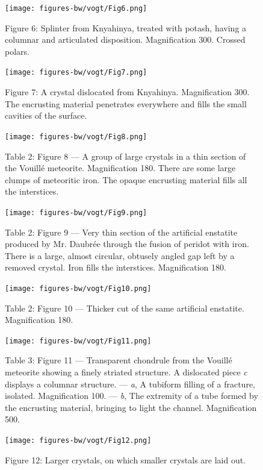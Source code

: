 \documentclass[a4paper, 12pt, oneside]{article}
\begin{document}
\clearpage
\begin{figure}[b]
\centering
\texttt{[image: figures-bw/vogt/Fig6.png]}
\caption{Figure 6: Splinter from Knyahinya, treated with potash, having a columnar and articulated disposition. Magnification 300. Crossed polars.}
\end{figure}
\clearpage
\begin{figure}[b]
\centering
\texttt{[image: figures-bw/vogt/Fig7.png]}
\caption{Figure 7: A crystal dislocated from Knyahinya. Magnification 300. The encrusting material penetrates everywhere and fills the small cavities of the surface.}
\end{figure}
\clearpage
\begin{figure}[b]
\texttt{[image: figures-bw/vogt/Fig8.png]}
\caption{Table 2: Figure 8 --- A group of large crystals in a thin section of the Vouillé meteorite. Magnification 180. There are some large clumps of meteoritic iron. The opaque encrusting material fills all the interstices.}
\centering
\end{figure}
\clearpage
\begin{figure}[b]
\texttt{[image: figures-bw/vogt/Fig9.png]}
\caption{Table 2: Figure 9 --- Very thin section of the artificial enstatite produced by Mr. Daubrée through the fusion of peridot with iron. There is a large, almost circular, obtusely angled gap left by a removed crystal. Iron fills the interstices. Magnification 180.}
\centering
\end{figure}
\clearpage
\begin{figure}[b]
\texttt{[image: figures-bw/vogt/Fig10.png]}
\caption{Table 2: Figure 10 --- Thicker cut of the same artificial enstatite. Magnification 180.}
\centering
\end{figure}
\clearpage
\begin{figure}[b]
\texttt{[image: figures-bw/vogt/Fig11.png]}
\caption{Table 3: Figure 11 --- Transparent chondrule from the Vouillé meteorite showing a finely striated structure. A dislocated piece \emph{c} displays a columnar structure. --- \emph{a}, A tubiform filling of a fracture, isolated. Magnification 100. --- \emph{b}, The extremity of a tube formed by the encrusting material, bringing to light the channel. Magnification 500.}
\centering
\end{figure}
\clearpage
{}
\begin{figure}[b]
\centering
\texttt{[image: figures-bw/vogt/Fig12.png]}
\caption{Figure 12: Larger crystals, on which smaller crystals are laid out.}
\end{figure}
\end{document}
